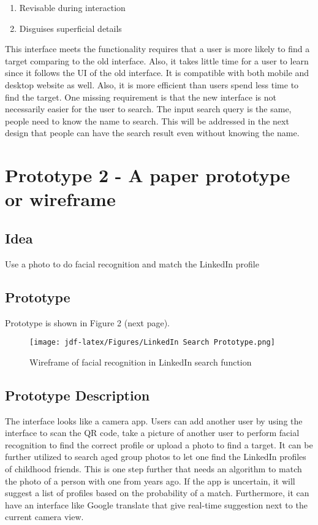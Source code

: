 \documentclass[
	letterpaper, %
]{jdf}
\begin{document}
\begin{enumerate}
    \item Revisable during interaction
    \item Disguises superficial details
\end{enumerate}

This interface meets the functionality requires that a user is more likely to find a target comparing to the old interface. Also, it takes little time for a user to learn since it follows the UI of the old interface. It is compatible with both mobile and desktop website as well. Also, it is more efficient than users spend less time to find the target. One missing requirement is that the new interface is not necessarily easier for the user to search. The input search query is the same, people need to know the name to search. This will be addressed in the next design that people can have the search result even without knowing the name.

\section{Prototype 2 - A paper prototype or wireframe}
\subsection{Idea}
Use a photo to do facial recognition and match the LinkedIn profile
\subsection{Prototype}
Prototype is shown in Figure 2 (next page). 
\begin{figure}[h]
	\centering
	\texttt{[image: jdf-latex/Figures/LinkedIn Search Prototype.png]}
	\caption{Wireframe of facial recognition in LinkedIn search function}
	\label{fig:wizard}
\end{figure}
\subsection{Prototype Description}
The interface looks like a camera app. Users can add another user by using the interface to scan the QR code, take a picture of another user to perform facial recognition to find the correct profile or upload a photo to find a target. It can be further utilized to search aged group photos to let one find the LinkedIn profiles of childhood friends. This is one step further that needs an algorithm to match the photo of a person with one from years ago. If the app is uncertain, it will suggest a list of profiles based on the probability of a match. Furthermore, it can have an interface like Google translate that give real-time suggestion next to the current camera view.
\end{document}
